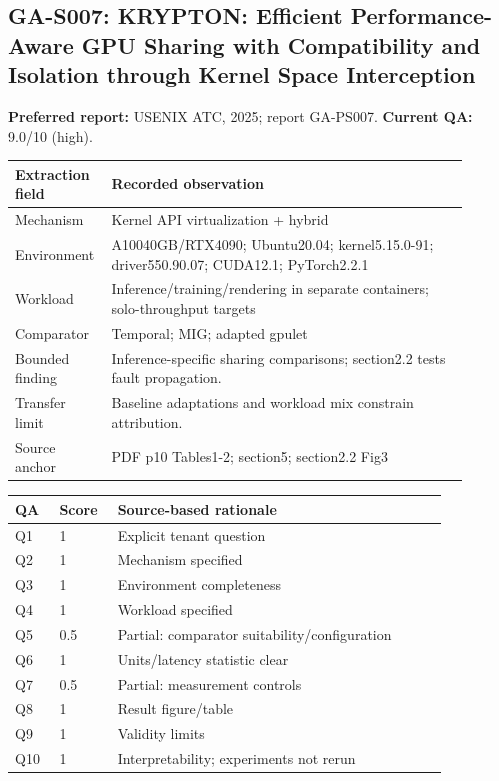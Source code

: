 \subsection{GA-S007: KRYPTON: Efficient Performance-Aware GPU Sharing with Compatibility and Isolation through Kernel Space Interception}
\textbf{Preferred report:} USENIX ATC, 2025; report GA-PS007. \textbf{Current QA:} 9.0/10 (high).
\begin{longtable}{P{0.15\linewidth}P{0.75\linewidth}}
\toprule Extraction field & Recorded observation\\\midrule\endhead
Mechanism & Kernel API virtualization + hybrid\\
Environment & A10040GB/RTX4090; Ubuntu20.04; kernel5.15.0-91; driver550.90.07; CUDA12.1; PyTorch2.2.1\\
Workload & Inference/training/rendering in separate containers; solo-throughput targets\\
Comparator & Temporal; MIG; adapted gpulet\\
Bounded finding & Inference-specific sharing comparisons; section2.2 tests fault propagation.\\
Transfer limit & Baseline adaptations and workload mix constrain attribution.\\
Source anchor & PDF p10 Tables1-2; section5; section2.2 Fig3\\
\bottomrule\end{longtable}
\begin{longtable}{P{0.09\linewidth}P{0.10\linewidth}P{0.67\linewidth}}
\toprule QA & Score & Source-based rationale\\\midrule\endhead
Q1 & 1 & Explicit tenant question\\
Q2 & 1 & Mechanism specified\\
Q3 & 1 & Environment completeness\\
Q4 & 1 & Workload specified\\
Q5 & 0.5 & Partial: comparator suitability/configuration\\
Q6 & 1 & Units/latency statistic clear\\
Q7 & 0.5 & Partial: measurement controls\\
Q8 & 1 & Result figure/table\\
Q9 & 1 & Validity limits\\
Q10 & 1 & Interpretability; experiments not rerun\\
\bottomrule\end{longtable}

